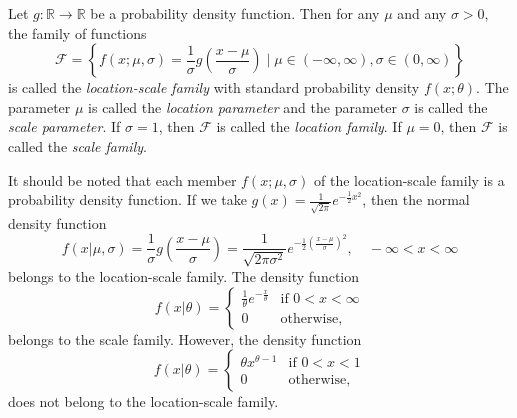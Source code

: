 \begin{definition}
    Let $g : \mathbb{R} \to \mathbb{R}$ be a probability density function. Then for
    any $\mu$ and any $\sigma > 0$, the family of functions
    \begin{equation}
        \mathcal{F} = \left\{ f(x; \mu, \sigma) = \frac{1}{\sigma} g\left(\frac{x - \mu}{\sigma}\right) \mid \mu \in (-\infty, \infty), \sigma \in (0, \infty) \right\}
    \end{equation}
    is called the \textit{location-scale family} with standard probability density $f(x; \theta)$.
    The parameter $\mu$ is called the \textit{location parameter} and the parameter $\sigma$ is
    called the \textit{scale parameter}. If $\sigma = 1$, then $\mathcal{F}$ is called the \textit{location family}. If
    $\mu = 0$, then $\mathcal{F}$ is called the \textit{scale family}.
\end{definition}

It should be noted that each member $f(x; \mu, \sigma)$ of the location-scale
family is a probability density function. If we take $g(x) = \frac{1}{\sqrt{2\pi}} e^{-\frac{1}{2}x^2}$, then
the normal density function
\begin{equation*}
    f(x| \mu, \sigma) = \frac{1}{\sigma} g\left(\frac{x - \mu}{\sigma}\right) = \frac{1}{\sqrt{2\pi\sigma^2}} e^{-\frac{1}{2}\left(\frac{x-\mu}{\sigma}\right)^2}, \quad -\infty < x < \infty
\end{equation*}
belongs to the location-scale family. The density function
\begin{equation}
    f(x | \theta) = \begin{cases}
        \frac{1}{\theta} e^{-\frac{x}{\theta}} & \text{if } 0 < x < \infty \\
        0 & \text{otherwise,}
    \end{cases}
\end{equation}
belongs to the scale family. However, the density function
\begin{equation}
    f(x | \theta) = \begin{cases}
        \theta x^{\theta - 1} & \text{if } 0 < x < 1 \\
        0 & \text{otherwise,}
    \end{cases}
\end{equation}
does not belong to the location-scale family.

